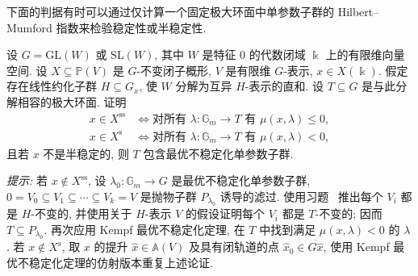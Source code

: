 下面的判据有时可以通过仅计算一个固定极大环面中单参数子群的 Hilbert--Mumford 指数来检验稳定性或半稳定性.
\begin{exercise}\label{src:8.6.14}
设 $G=\mathrm{GL}(W)$ 或 $\mathrm{SL}(W)$, 其中 $W$ 是特征 $0$ 的代数闭域 $\Bbbk$ 上的有限维向量空间. 设 $X\subseteq\mathbb P(V)$ 是 $G$-不变闭子概形, $V$ 是有限维 $G$-表示, $x\in X(\Bbbk)$. 假定存在线性约化子群 $H\subseteq G_x$, 使 $W$ 分解为互异 $H$-表示的直和. 设 $T\subseteq G$ 是与此分解相容的极大环面. 证明
\begin{align*}
x\in X^{\mathrm{ss}}&\iff\text{对所有 $\lambda:\mathbb G_m\to T$ 有 }\mu(x,\lambda)\leq0,\\
x\in X^{\mathrm s}&\iff\text{对所有 $\lambda:\mathbb G_m\to T$ 有 }\mu(x,\lambda)<0,
\end{align*}
且若 $x$ 不是半稳定的, 则 $T$ 包含最优不稳定化单参数子群.

\textit{提示:} 若 $x\notin X^{\mathrm{ss}}$, 设 $\lambda_0:\mathbb G_m\to G$ 是最优不稳定化单参数子群, $0=V_0\subseteq V_1\subseteq\cdots\subseteq V_k=V$ 是抛物子群 $P_{\lambda_0}$ 诱导的滤过. 使用习题~ 推出每个 $V_i$ 都是 $H$-不变的, 并使用关于 $H$-表示 $V$ 的假设证明每个 $V_i$ 都是 $T$-不变的; 因而 $T\subseteq P_{\lambda_0}$. 再次应用 Kempf 最优不稳定化定理, 在 $T$ 中找到满足 $\mu(x,\lambda)<0$ 的 $\lambda$. 若 $x\notin X^{\mathrm s}$, 取 $x$ 的提升 $\widehat x\in\mathbb A(V)$ 及具有闭轨道的点 $\widehat x_0\in\overline{G\widehat x}$, 使用 Kempf 最优不稳定化定理的仿射版本重复上述论证.
\end{exercise}
